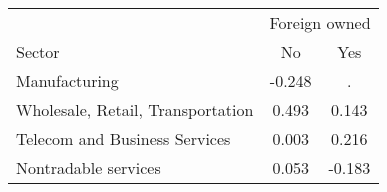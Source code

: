 \begin{tabular}{lcc}
\toprule
 & \multicolumn{2}{c}{Foreign owned} \\
\cmidrule(lr){2-3}
Sector & No & Yes \\
\midrule
Manufacturing & -0.248 & . \\
Wholesale, Retail, Transportation & 0.493 & 0.143 \\
Telecom and Business Services & 0.003 & 0.216 \\
Nontradable services & 0.053 & -0.183 \\
\bottomrule
\end{tabular}
